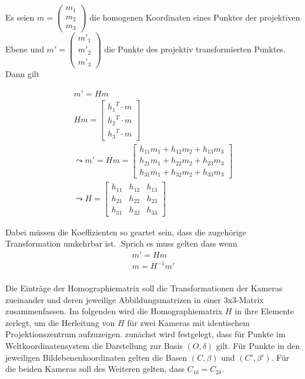 Es seien \ensuremath{m = \begin{pmatrix}
		m_1\\m_2\\m_3
\end{pmatrix}} die homogenen Koordinaten eines Punktes der projektiven Ebene und \ensuremath{m' = \begin{pmatrix}
m'_1\\m'_2\\m'_3
\end{pmatrix}} die Punkte des projektiv transformierten Punktes. Dann gilt

\begin{gather}
	m' = Hm\\
	Hm = \begin{bmatrix}
	{h_1}^T \cdot m\\{h_2}^T \cdot m\\{h_3}^T \cdot m
	\end{bmatrix} \\
	\leadsto 
	m'= Hm= \begin{bmatrix}
	h_{11}m_1+h_{12}m_2+h_{13}m_3\\
	h_{21}m_1+h_{22}m_2+h_{23}m_3\\
	h_{31}m_1+h_{32}m_2+h_{33}m_3
	\end{bmatrix}\\
	\leadsto 
	H=\begin{bmatrix}
	h_{11}&h_{12}&h_{13}\\
	h_{21}&h_{22}&h_{23}\\
	h_{31}&h_{32}&h_{33}
	\end{bmatrix}
\end{gather}

Dabei müssen die Koeffizienten so geartet sein, dass die zugehörige Transformation umkehrbar ist. \cite{HZ}\cite{Peiffer}.Sprich es muss gelten dass wenn 
\begin{gather}
	m'=Hm\\
	m= H^{-1}m'
\end{gather}\\

Die Einträge der Homographiematrix  soll die Transformationen der Kameras zueinander und deren jeweilige Abbildungsmatrizen in einer 3x3-Matrix zusammenfassen. Im folgenden wird die Homographiematrix $H$ in ihre Elemente zerlegt, um die Herleitung von $H$ für zwei Kameras mit identischem Projektionszentrum aufzuzeigen\cite{HZ,Peiffer,Elements}. zunächst wird festgelegt, dass für Punkte im Weltkoordinatensystem die Darstellung zur Basis $(O,\delta)$ gilt. Für Punkte in den jeweiligen Bildebenenkoordinaten gelten die Basen $(C,\beta)$ und $(C',\beta')$. Für die beiden Kameras soll des Weiteren gelten, dass $C_{1\delta} = C_{2\delta}$. 

